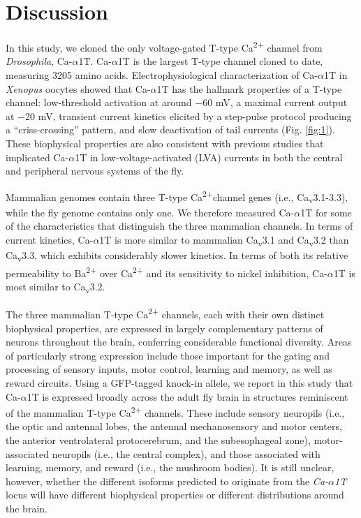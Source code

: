 \section*{Discussion}

In this study, we cloned the only voltage-gated T-type Ca\textsuperscript{2+} channel from \emph{Drosophila}, Ca-$\alpha$1T.
Ca-$\alpha$1T is the largest T-type channel cloned to date, measuring 3205 amino acids\cite{senatore:2010aa}.
Electrophysiological characterization of Ca-$\alpha$1T in \emph{Xenopus} oocytes showed that Ca-$\alpha$1T has the hallmark properties of a T-type channel: low-threshold activation at around $-$60 mV, a maximal current output at $-$20 mV, transient current kinetics elicited by a step-pulse protocol producing a ``criss-crossing'' pattern, and slow deactivation of tail currents (Fig. \ref{fig:1}).
These biophysical properties are also consistent with previous studies that implicated Ca-$\alpha$1T in low-voltage-activated (LVA) currents in both the central and peripheral nervous systems of the fly\cite{Ryglewski:2012jk, Iniguez:2013ib}.

Mammalian genomes contain three T-type Ca\textsuperscript{2+}channel genes (i.e., Ca\textsubscript{v}3.1-3.3), while the fly genome contains only one.
We therefore measured Ca-$\alpha$1T for some of the characteristics that distinguish the three mammalian channels.
In terms of current kinetics, Ca-$\alpha$1T is more similar to mammalian Ca\textsubscript{v}3.1 and Ca\textsubscript{v}3.2 than Ca\textsubscript{v}3.3, which exhibits considerably  slower kinetics.
In terms of both its relative permeability to Ba\textsuperscript{2+} over Ca\textsuperscript{2+} and its sensitivity to nickel inhibition, Ca-$\alpha$1T is most similar to Ca\textsubscript{v}3.2\cite{kang:2006aa, park:2013aa}.

The three mammalian T-type Ca\textsuperscript{2+} channels,  each with their own distinct biophysical properties, are expressed in largely complementary patterns of neurons throughout the brain, conferring considerable functional diversity. Areas of particularly strong expression include those important for the gating and processing of sensory inputs, motor control, learning and memory, as well as reward circuits\cite{talley:1999aa}. 
Using a GFP-tagged knock-in allele, we report in this study that Ca-$\alpha$1T is expressed broadly across the adult fly brain in structures reminiscent of the mammalian T-type Ca\textsuperscript{2+} channels.
These include sensory neuropils (i.e., the optic and antennal lobes, the antennal mechanosensory and motor centers, the anterior ventrolateral protocerebrum, and the subesophageal zone), motor-associated neuropils (i.e., the central complex), and those associated with learning, memory, and reward (i.e., the mushroom bodies).
It is still unclear, however, whether the different isoforms predicted to originate from the \emph{Ca-$\alpha$1T} locus will have different biophysical properties or different distributions around the brain. 

